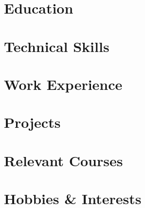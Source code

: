 \documentclass[letterpaper,11pt]{article}
\begin{document}


\section{Education}


\section{Technical Skills}


\section{Work Experience}


\section{Projects}


\section{Relevant Courses}


\section{Hobbies \& Interests}

\end{document}
